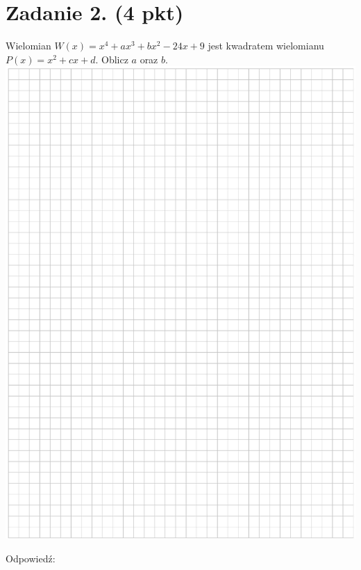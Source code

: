 \documentclass[10pt]{article}
\begin{document}
\section*{Zadanie 2. (4 pkt)}
Wielomian \(W(x)=x^{4}+a x^{3}+b x^{2}-24 x+9\) jest kwadratem wielomianu \(P(x)=x^{2}+c x+d\). Oblicz \(a\) oraz \(b\).\\
\includegraphics[max width=\textwidth, center]{2024_11_21_d9af6ed2d610d3f2d2cbg-04}

Odpowiedź:
\end{document}
